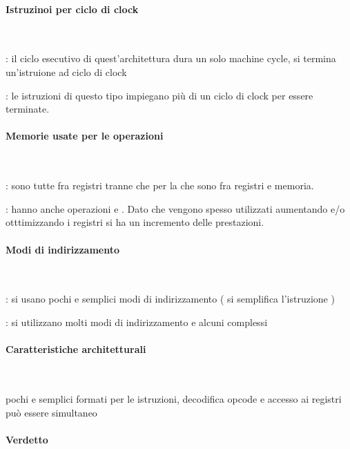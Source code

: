 \documentclass[arch.tex]{subfiles}
\begin{document}
\paragraph{Istruzinoi per ciclo di clock} \mbox{} \\%
\label{par:istruzinoi_per_ciclo_di_clock}

: il ciclo esecutivo di quest'architettura dura un solo machine cycle, 
 si termina un'istruione ad  ciclo di clock

: le istruzioni di questo tipo impiegano più di un ciclo di clock per essere 
terminate.

\paragraph{Memorie usate per le operazioni} \mbox{} \\%
\label{par:memorie_usate_per_le_operazioni}

: sono tutte fra registri tranne che per la  che sono fra registri e 
memoria.

: hanno anche operazioni  e . Dato che 
vengono spesso utilizzati  aumentando e/o otttimizzando i registri
si ha un incremento delle prestazioni.

\paragraph{Modi di indirizzamento} \mbox{} \\%
\label{par:modi_di_indirizzamento}

: si usano pochi e semplici modi di indirizzamento ( si semplifica l'istruzione ) 

: si utilizzano molti modi di indirizzamento e alcuni complessi

\paragraph{Caratteristiche architetturali} \mbox{} \\%
\label{par:caratteristiche_architetturali}

 pochi e semplici formati  per le istruzioni, decodifica opcode e 
accesso ai registri può essere simultaneo

\paragraph{Verdetto} \mbox{} \\%
\label{par:verdetto}
\end{document}
